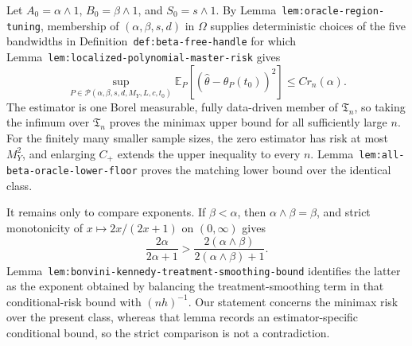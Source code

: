 Let \(A_0=\alpha\wedge1\), \(B_0=\beta\wedge1\), and \(S_0=s\wedge1\). By Lemma~\texttt{lem:oracle-region-tuning}, membership of \((\alpha,\beta,s,d)\) in \(\Omega\) supplies deterministic choices of the five bandwidths in Definition~\texttt{def:beta-free-handle} for which Lemma~\texttt{lem:localized-polynomial-master-risk} gives
\[
\sup_{P\in\mathcal P(\alpha,\beta,s,d,M_Y,L,c,t_0)}\mathbb E_P[(\widehat\theta-\theta_P(t_0))^2]\le C r_n(\alpha).
\]
The estimator is one Borel measurable, fully data-driven member of \(\mathfrak T_n\), so taking the infimum over \(\mathfrak T_n\) proves the minimax upper bound for all sufficiently large \(n\). For the finitely many smaller sample sizes, the zero estimator has risk at most \(M_Y^2\), and enlarging \(C_+\) extends the upper inequality to every \(n\). Lemma~\texttt{lem:all-beta-oracle-lower-floor} proves the matching lower bound over the identical class.

It remains only to compare exponents. If \(\beta<\alpha\), then \(\alpha\wedge\beta=\beta\), and strict monotonicity of \(x\mapsto2x/(2x+1)\) on \((0,\infty)\) gives
\[
\frac{2\alpha}{2\alpha+1}>\frac{2(\alpha\wedge\beta)}{2(\alpha\wedge\beta)+1}.
\]
Lemma~\texttt{lem:bonvini-kennedy-treatment-smoothing-bound} identifies the latter as the exponent obtained by balancing the treatment-smoothing term in that conditional-risk bound with \((nh)^{-1}\). Our statement concerns the minimax risk over the present class, whereas that lemma records an estimator-specific conditional bound, so the strict comparison is not a contradiction.